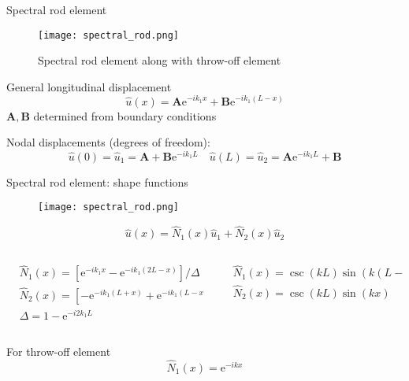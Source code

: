 \documentclass[10pt,aspectratio=169,notes]{beamer} %
\newcommand{\matr}[1]{\boldsymbol{#1}}
\newcommand{\myexp}{\mathrm{e}}
\begin{document}
\note{
}
\begin{frame}[t]{Spectral rod element}
	\begin{figure}
		\texttt{[image: spectral\_rod.png]}
		\caption{Spectral rod element along with throw-off element}
	\end{figure}	
General longitudinal displacement
\begin{equation*}
	\hat{u}(x) = \matr{A} \myexp^{-i k_1 x} +\matr{B} \myexp^{-i k_1 (L-x)}
\end{equation*}
\( \matr{A}, \matr{B}\) determined from boundary conditions

Nodal displacements (degrees of freedom):
\begin{equation*}
\hat{u}(0) = \hat{u}_1 = \matr{A} + \matr{B} \myexp^{- i k_1 L} \quad  \hat{u}(L) = \hat{u}_2 = \matr{A} \myexp^{- i k_1 L} + \matr{B}
\end{equation*}
\end{frame}
\note{
}
\begin{frame}[t]{Spectral rod element: shape functions}
	\begin{figure}
	\texttt{[image: spectral\_rod.png]}
\end{figure}	
\begin{equation*}
\hat{u}(x) = \hat{N}_1(x) \hat{u}_1 + \hat{N}_2(x) \hat{u}_2
\end{equation*}
\begin{columns}[T]
	\begin{column}{0.5\textwidth}
		\begin{align*}
		&\hat{N}_1(x) = \left[ \myexp^{-i k _1 x} - \myexp^{-i k_1 (2L-x)}\right]/\Delta\\
		&\hat{N}_2(x) = \left[ -\myexp^{-i k _1(L+x) } + \myexp^{-i k_1 (L-x)}\right]/\Delta\\
		&\Delta = 1-\myexp^{-i 2 k_1 L}
		\end{align*}
	\end{column}
	\begin{column}{0.5\textwidth}
		\begin{align*}
	&\hat{N}_1(x) = \csc(k L) \sin\left(k (L-x)\right)\\
	&\hat{N}_2(x) = \csc(k L) \sin(k  x)
	\end{align*}	
	\end{column}
\end{columns}	
For throw-off element
\begin{equation*}
\hat{N}_1(x) = \myexp^{-i k x}
\end{equation*}	
\end{frame}
\end{document}
